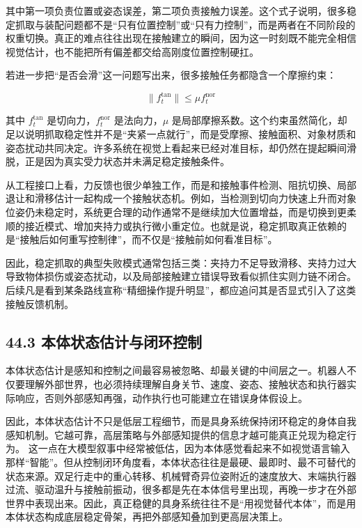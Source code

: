 其中第一项负责位置或姿态误差，第二项负责接触力误差。这个式子说明，很多稳定抓取与装配问题都不是“只有位置控制”或“只有力控制”，而是两者在不同阶段的权重切换。真正的难点往往出现在接触建立的瞬间，因为这一时刻既不能完全相信视觉估计，也不能把所有偏差都交给高刚度位置控制硬扛。

若进一步把“是否会滑”这一问题写出来，很多接触任务都隐含一个摩擦约束：

\begin{equation*}
\|f_t^{\text{tan}}\| \le \mu f_t^{\text{nor}}
\end{equation*}

其中 \(f_t^{\text{tan}}\) 是切向力，\(f_t^{\text{nor}}\) 是法向力，\(\mu\) 是局部摩擦系数。这个约束虽然简化，却足以说明抓取稳定性并不是“夹紧一点就行”，而是受摩擦、接触面积、对象材质和姿态扰动共同决定。许多系统在视觉上看起来已经对准目标，却仍然在提起瞬间滑脱，正是因为真实受力状态并未满足稳定接触条件。

从工程接口上看，力反馈也很少单独工作，而是和接触事件检测、阻抗切换、局部退让和滑移估计一起构成一个接触状态机。例如，当检测到切向力快速上升而对象位姿仍未稳定时，系统更合理的动作通常不是继续加大位置增益，而是切换到更柔顺的接近模式、增加夹持力或执行微小重定位。也就是说，稳定抓取真正依赖的是“接触后如何重写控制律”，而不仅是“接触前如何看准目标”。

因此，稳定抓取的典型失败模式通常包括三类：夹持力不足导致滑移、夹持力过大导致物体损伤或姿态扰动，以及局部接触建立错误导致看似抓住实则力链不闭合。后续凡是看到某条路线宣称“精细操作提升明显”，都应追问其是否显式引入了这类接触反馈机制。

\subsection*{44.3 本体状态估计与闭环控制}


本体状态估计是感知和控制之间最容易被忽略、却最关键的中间层之一。机器人不仅要理解外部世界，也必须持续理解自身关节、速度、姿态、接触状态和执行器实际响应，否则外部感知再强，动作执行也可能建立在错误身体假设上。

因此，本体状态估计不只是低层工程细节，而是具身系统保持闭环稳定的身体自我感知机制。它越可靠，高层策略与外部感知提供的信息才越可能真正兑现为稳定行为。 这一点在大模型叙事中经常被低估，因为本体感觉看起来不如视觉语言输入那样“智能”。但从控制闭环角度看，本体状态往往是最硬、最即时、最不可替代的状态来源。双足行走中的重心转移、机械臂奇异位姿附近的速度放大、末端执行器过流、驱动温升与接触前振动，很多都是先在本体信号里出现，再晚一步才在外部世界中表现出来。因此，真正稳健的具身系统往往不是“用视觉替代本体”，而是用本体状态构成底层稳定骨架，再把外部感知叠加到更高层决策上。

